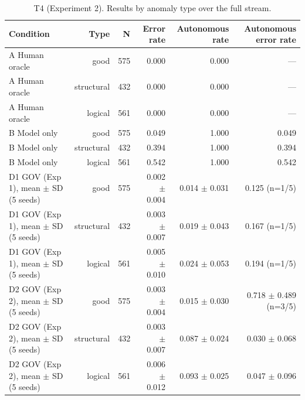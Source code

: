 \begin{table}[t]\centering\small
\caption{T4 (Experiment 2). Results by anomaly type over the full stream.}
\label{tab:T4_by_anomaly_type_exp2}
\begin{tabular}{lrrrrr}\hline
Condition & Type & N & Error rate & Autonomous rate & Autonomous error rate \\ \hline
A Human oracle & good & 575 & 0.000 & 0.000 & — \\
A Human oracle & structural & 432 & 0.000 & 0.000 & — \\
A Human oracle & logical & 561 & 0.000 & 0.000 & — \\
B Model only & good & 575 & 0.049 & 1.000 & 0.049 \\
B Model only & structural & 432 & 0.394 & 1.000 & 0.394 \\
B Model only & logical & 561 & 0.542 & 1.000 & 0.542 \\
D1 GOV (Exp 1), mean $\pm$ SD (5 seeds) & good & 575 & 0.002 $\pm$ 0.004 & 0.014 $\pm$ 0.031 & 0.125 (n=1/5) \\
D1 GOV (Exp 1), mean $\pm$ SD (5 seeds) & structural & 432 & 0.003 $\pm$ 0.007 & 0.019 $\pm$ 0.043 & 0.167 (n=1/5) \\
D1 GOV (Exp 1), mean $\pm$ SD (5 seeds) & logical & 561 & 0.005 $\pm$ 0.010 & 0.024 $\pm$ 0.053 & 0.194 (n=1/5) \\
D2 GOV (Exp 2), mean $\pm$ SD (5 seeds) & good & 575 & 0.003 $\pm$ 0.004 & 0.015 $\pm$ 0.030 & 0.718 $\pm$ 0.489 (n=3/5) \\
D2 GOV (Exp 2), mean $\pm$ SD (5 seeds) & structural & 432 & 0.003 $\pm$ 0.007 & 0.087 $\pm$ 0.024 & 0.030 $\pm$ 0.068 \\
D2 GOV (Exp 2), mean $\pm$ SD (5 seeds) & logical & 561 & 0.006 $\pm$ 0.012 & 0.093 $\pm$ 0.025 & 0.047 $\pm$ 0.096 \\
\hline\end{tabular}
\end{table}
